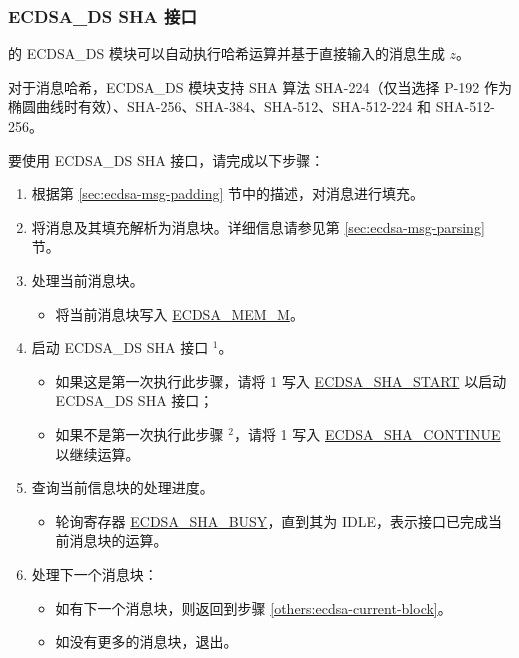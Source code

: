 \documentclass[main\_\_CN.tex]{subfiles}
\begin{document}
\subsubsection{ECDSA\_DS SHA 接口}
\label{sec:ecdsa-sha-interface}
\chipseries{} 的 ECDSA\_DS 模块可以自动执行哈希运算并基于直接输入的消息生成 $z$。

对于消息哈希，ECDSA\_DS 模块支持 SHA 算法 SHA-224（仅当选择 P-192 作为椭圆曲线时有效）、SHA-256、SHA-384、SHA-512、SHA-512-224 和 SHA-512-256。

要使用 ECDSA\_DS SHA 接口，请完成以下步骤：

\begin{enumerate}
	\item 根据第 \ref{sec:ecdsa-msg-padding} 节中的描述，对消息进行填充。
	\item 将消息及其填充解析为消息块。详细信息请参见第 \ref{sec:ecdsa-msg-parsing} 节。
	\item \label{others:ecdsa-current-block} 处理当前消息块。
	      \begin{itemize}
		      \item 将当前消息块写入 \hyperref[tab:ecdsa-memory]{ECDSA\_MEM\_M}。
	      \end{itemize}
	\item 启动 ECDSA\_DS SHA 接口 \hyperref[others:ecdsa-note-sha]{$^1$}。
	      \begin{itemize}
		      \item 如果这是第一次执行此步骤，请将 1 写入 \hyperref[fielddesc:ECDSASHASTART]{ECDSA\_SHA\_START} 以启动 ECDSA\_DS SHA 接口；
		      \item 如果不是第一次执行此步骤 \hyperref[others:ecdsa-note-sha]{$^2$}，请将 1 写入 \hyperref[fielddesc:ECDSASHACONTINUE]{ECDSA\_SHA\_CONTINUE} 以继续运算。
	      \end{itemize}
	\item 查询当前信息块的处理进度。
	      \begin{itemize}
		      \item 轮询寄存器 \hyperref[fielddesc:ECDSASHABUSY]{ECDSA\_SHA\_BUSY}，直到其为 IDLE，表示接口已完成当前消息块的运算。
	      \end{itemize}

	\item 处理下一个消息块：
	      \begin{itemize}
		      \item 如有下一个消息块，则返回到步骤 \ref{others:ecdsa-current-block}。
		      \item 如没有更多的消息块，退出。
	      \end{itemize}

\end{enumerate}
\end{document}
